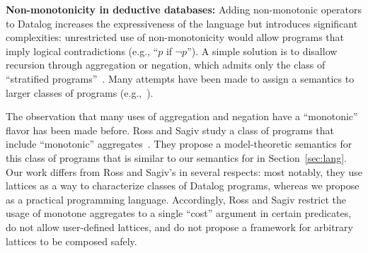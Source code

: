 




\vspace{0.5em}\noindent
\textbf{Non-monotonicity in deductive databases:} Adding non-monotonic operators
to Datalog increases the expressiveness of the language but introduces
significant complexities: unrestricted use of non-monotonicity would allow
programs that imply logical contradictions (e.g., ``$p$ if $\lnot p$''). A
simple solution is to disallow recursion through aggregation or negation, which
admits only the class of ``stratified programs''~\cite{Apt1988}. Many attempts
have been made to assign a semantics to larger classes of programs
(e.g.,~\cite{Gelfond1988,Ross1990,VanGelder1991}).

The observation that many uses of aggregation and negation have a ``monotonic''
flavor has been made before. Ross and Sagiv study a class of programs that
include ``monotonic'' aggregates~\cite{Ross1992}. They propose a model-theoretic
semantics for this class of programs that is similar to our semantics for \lang
in Section~\ref{sec:lang}. Our work differs from Ross and Sagiv's in several
respects: most notably, they use lattices as a way to characterize classes of
Datalog programs, whereas we propose \lang as a practical programming
language. Accordingly, Ross and Sagiv restrict the usage of monotone aggregates
to a single ``cost'' argument in certain predicates, do not allow user-defined
lattices, and do not propose a framework for arbitrary lattices to be composed
safely.

